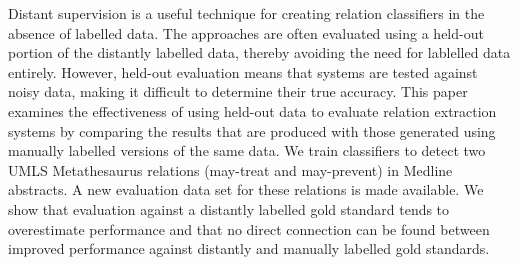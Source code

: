 Distant supervision is a useful technique for creating relation classifiers in the absence of labelled data. The approaches are often evaluated using a held-out portion of the distantly labelled data, thereby avoiding the need for lablelled data entirely. However, held-out evaluation means that systems are tested against noisy data, making it difficult to determine their true accuracy. This paper examines the effectiveness of using held-out data to evaluate relation extraction systems by comparing the results that are produced with those generated using manually labelled versions of the same data. We train classifiers to detect two UMLS Metathesaurus relations (may-treat and may-prevent) in Medline abstracts. A new evaluation data set for these relations is made available. We show that evaluation against a distantly labelled gold standard tends to overestimate performance and that no direct connection can be found between improved performance against distantly and manually labelled gold standards.
